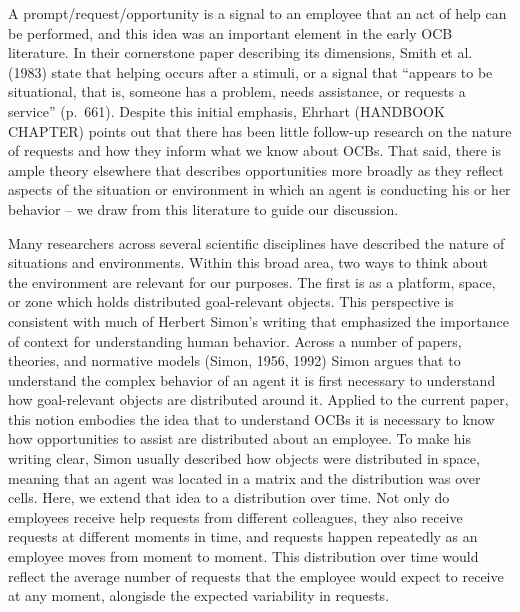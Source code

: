 \documentclass[english,,man]{apa6}
\theoremstyle{definition}
\theoremstyle{definition}
\theoremstyle{definition}
\theoremstyle{remark}
\begin{document}
A prompt/request/opportunity is a signal to an employee that an act of
help can be performed, and this idea was an important element in the
early OCB literature. In their cornerstone paper describing its
dimensions, Smith et al. (1983) state that helping occurs after a
stimuli, or a signal that \enquote{appears to be situational, that is,
someone has a problem, needs assistance, or requests a service}
(p.~661). Despite this initial emphasis, Ehrhart (HANDBOOK CHAPTER)
points out that there has been little follow-up research on the nature
of requests and how they inform what we know about OCBs. That said,
there is ample theory elsewhere that describes opportunities more
broadly as they reflect aspects of the situation or environment in which
an agent is conducting his or her behavior -- we draw from this
literature to guide our discussion.

Many researchers across several scientific disciplines have described
the nature of situations and environments. Within this broad area, two
ways to think about the environment are relevant for our purposes. The
first is as a platform, space, or zone which holds distributed
goal-relevant objects. This perspective is consistent with much of
Herbert Simon's writing that emphasized the importance of context for
understanding human behavior. Across a number of papers, theories, and
normative models (Simon, 1956, 1992) Simon argues that to understand the
complex behavior of an agent it is first necessary to understand how
goal-relevant objects are distributed around it. Applied to the current
paper, this notion embodies the idea that to understand OCBs it is
necessary to know how opportunities to assist are distributed about an
employee. To make his writing clear, Simon usually described how objects
were distributed in space, meaning that an agent was located in a matrix
and the distribution was over cells. Here, we extend that idea to a
distribution over time. Not only do employees receive help requests from
different colleagues, they also receive requests at different moments in
time, and requests happen repeatedly as an employee moves from moment to
moment. This distribution over time would reflect the average number of
requests that the employee would expect to receive at any moment,
alongisde the expected variability in requests.
\end{document}
